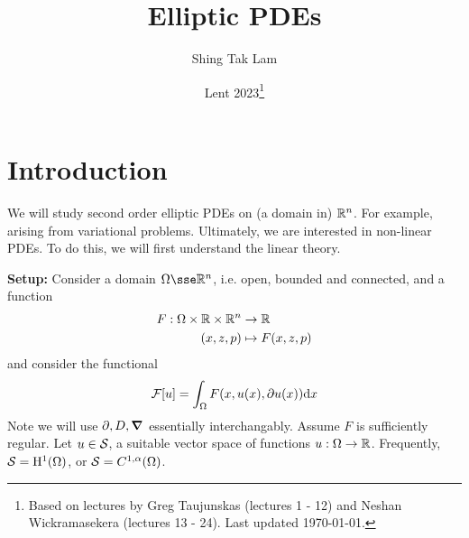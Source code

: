 \documentclass{article}
\title{Elliptic PDEs}
\author{Shing Tak Lam}
\date{Lent 2023\footnote{Based on lectures by Greg Taujunskas (lectures 1 - 12) and Neshan Wickramasekera (lectures 13 - 24). Last updated \today.}}
\begin{document}
\maketitle

\tableofcontents

\lec

\setcounter{section}{-1}

\section{Introduction}

We will study second order elliptic PDEs on (a domain in) \(\mathbb{R}^n\). For example, arising from variational problems. Ultimately, we are interested in non-linear PDEs. To do this, we will first understand the linear theory.

\textbf{Setup:} Consider a domain \(\Omega \sse \R^n\), i.e. open, bounded and connected, and a function
\begin{align*}
    F : \Omega \times \mathbb{R} \times \mathbb{R}^n &\to \mathbb{R} \\
    (x, z, p) &\mapsto F(x, z, p)
\end{align*}
and consider the functional
\[\mathcal{F}[u] = \int_\Omega F(x, u(x), \partial u(x))\dd x\]
Note we will use \(\partial, D, \grad\) essentially interchangably. Assume \(F\) is sufficiently regular. Let \(u \in \mathcal{S}\), a suitable vector space of functions \(u : \Omega \to \mathbb{R}\). Frequently, \(\mathcal{S} = \mathrm{H}^1(\Omega)\), or \(\mathcal{S} = C^{1, \alpha}(\Omega)\).
\end{document}
